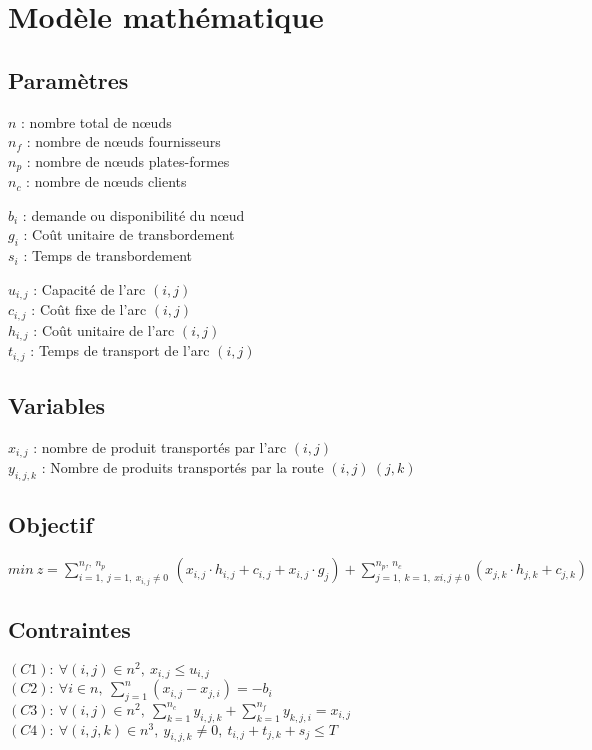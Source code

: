 \documentclass[a4paper, 12pt]{report}
\begin{document}
\chapter{Modèle mathématique}
\section{Paramètres}
$n$ : nombre total de nœuds\\
$n_f$ : nombre de nœuds fournisseurs\\
$n_p$ : nombre de nœuds plates-formes\\
$n_c$ : nombre de nœuds clients \newline

$b_i$ : demande ou disponibilité du n\oe{}ud\\
$g_i$ : Coût unitaire de transbordement\\
$s_i$ : Temps de transbordement\newline

$u_{i,j}$ : Capacité de l'arc $(i,j)$\\
$c_{i,j}$ : Coût fixe de l'arc $(i,j)$\\
$h_{i,j}$ : Coût unitaire de l'arc $(i,j)$\\
$t_{i,j}$ : Temps de transport de l'arc $(i,j)$

\section{Variables}
$x_{i,j}$ : nombre de produit transportés par l'arc $(i,j)$\\
$y_{i,j,k}$ : Nombre de produits transportés par la route $(i,j)\ (j,k)$\\

\section{Objectif}
$ min\ z = \sum_{i=1,\ j=1,\ x_{i,j}\not=0\ }^{n_f,\ n_p}
	(x_{i,j} \cdot h_{i,j} + c_{i,j} + x_{i,j} \cdot g_j) 
	    + \sum_{j=1,\ k=1,\ x{i,j} \not=0}^{n_p,\ n_c}(x_{j,k} \cdot h_{j,k} + c_{j,k})$

\section{Contraintes}
$ (C1):\ \forall (i,j)\in n^2,\ x_{i,j} \leq u_{i,j} $ \\
$ (C2):\ \forall i\in n, \ \sum_{j=1}^{n}(x_{i,j} - x_{j,i}) = -b_i$\\
$ (C3):\ \forall (i,j)\in n^2,\ \sum_{k=1}^{n_c} y_{i,j,k} + \sum_{k=1}^{n_f} y_{k,j,i} = x_{i,j}$\\
$ (C4):\ \forall (i,j,k)\in n^3,\ y_{i,j,k} \not= 0,\ 
	t_{i,j} + t_{j,k} + s_j \leq T$\\
\end{document}
